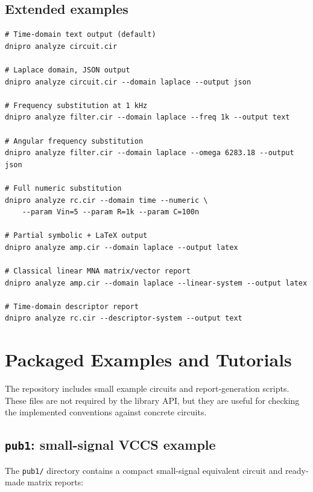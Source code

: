 \documentclass[11pt,a4paper]{article}
\newcommand{\code}[1]{\texttt{#1}}
\begin{document}
\subsection{Extended examples}

\begin{lstlisting}[style=shell]
# Time-domain text output (default)
dnipro analyze circuit.cir

# Laplace domain, JSON output
dnipro analyze circuit.cir --domain laplace --output json

# Frequency substitution at 1 kHz
dnipro analyze filter.cir --domain laplace --freq 1k --output text

# Angular frequency substitution
dnipro analyze filter.cir --domain laplace --omega 6283.18 --output json

# Full numeric substitution
dnipro analyze rc.cir --domain time --numeric \
    --param Vin=5 --param R=1k --param C=100n

# Partial symbolic + LaTeX output
dnipro analyze amp.cir --domain laplace --output latex

# Classical linear MNA matrix/vector report
dnipro analyze amp.cir --domain laplace --linear-system --output latex

# Time-domain descriptor report
dnipro analyze rc.cir --descriptor-system --output text
\end{lstlisting}

\section{Packaged Examples and Tutorials}
\label{sec:packaged-examples}

The repository includes small example circuits and report-generation scripts.
These files are not required by the library API, but they are useful for checking
the implemented conventions against concrete circuits.

\subsection{\texttt{pub1}: small-signal VCCS example}

The \code{pub1/} directory contains a compact small-signal equivalent circuit and
ready-made matrix reports:
\end{document}
